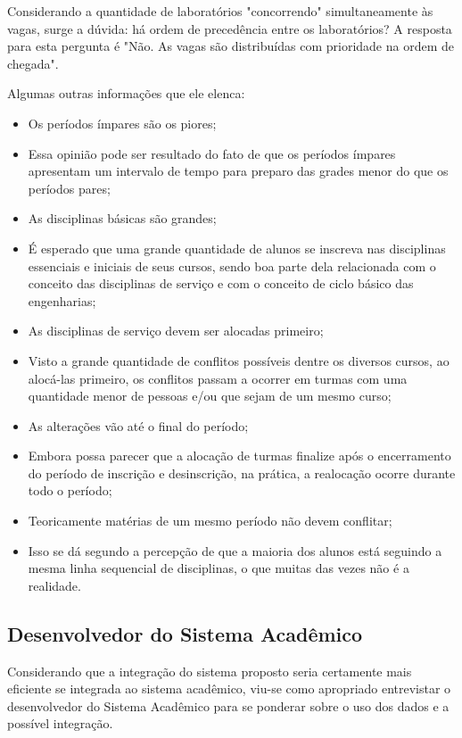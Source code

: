         Considerando a quantidade de laboratórios "concorrendo" simultaneamente às vagas, surge a dúvida: há ordem de precedência entre os laboratórios? A resposta para esta pergunta é "Não. As vagas são distribuídas com prioridade na ordem de chegada".

        Algumas outras informações que ele elenca:

        \begin{itemize}
            \item Os períodos ímpares são os piores;
            \item Essa opinião pode ser resultado do fato de que os períodos ímpares apresentam um intervalo de tempo para preparo das grades menor do que os períodos pares;
            \item As disciplinas básicas são grandes;
            \item É esperado que uma grande quantidade de alunos se inscreva nas disciplinas essenciais e iniciais de seus cursos, sendo boa parte dela relacionada com o conceito das disciplinas de serviço e com o conceito de ciclo básico das engenharias;
            \item As disciplinas de serviço devem ser alocadas primeiro;
            \item Visto a grande quantidade de conflitos possíveis dentre os diversos cursos, ao alocá-las primeiro, os conflitos passam a ocorrer em turmas com uma quantidade menor de pessoas e/ou que sejam de um mesmo curso;
            \item As alterações vão até o final do período;
            \item Embora possa parecer que a alocação de turmas finalize após o encerramento do período de inscrição e desinscrição, na prática, a realocação ocorre durante todo o período;
            \item Teoricamente matérias de um mesmo período não devem conflitar;
            \item Isso se dá segundo a percepção de que a maioria dos alunos está seguindo a mesma linha sequencial de disciplinas, o que muitas das vezes não é a realidade.
        \end{itemize}

    \subsection{Desenvolvedor do Sistema Acadêmico} %

        Considerando que a integração do sistema proposto seria certamente mais eficiente se integrada ao sistema acadêmico, viu-se como apropriado entrevistar o desenvolvedor do Sistema Acadêmico para se ponderar sobre o uso dos dados e a possível integração.

